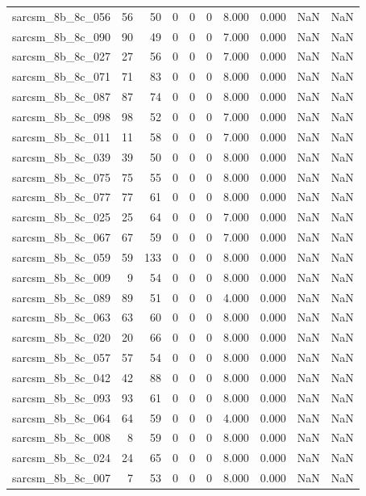 \documentclass{article}
\begin{document}
\begin{longtable}{lrrrrrrrrr}
sarcsm\_8b\_8c\_056 & 56 & 50 & 0 & 0 & 0 & 8.000 & 0.000 & NaN & NaN \\
sarcsm\_8b\_8c\_090 & 90 & 49 & 0 & 0 & 0 & 7.000 & 0.000 & NaN & NaN \\
sarcsm\_8b\_8c\_027 & 27 & 56 & 0 & 0 & 0 & 7.000 & 0.000 & NaN & NaN \\
sarcsm\_8b\_8c\_071 & 71 & 83 & 0 & 0 & 0 & 8.000 & 0.000 & NaN & NaN \\
sarcsm\_8b\_8c\_087 & 87 & 74 & 0 & 0 & 0 & 8.000 & 0.000 & NaN & NaN \\
sarcsm\_8b\_8c\_098 & 98 & 52 & 0 & 0 & 0 & 7.000 & 0.000 & NaN & NaN \\
sarcsm\_8b\_8c\_011 & 11 & 58 & 0 & 0 & 0 & 7.000 & 0.000 & NaN & NaN \\
sarcsm\_8b\_8c\_039 & 39 & 50 & 0 & 0 & 0 & 8.000 & 0.000 & NaN & NaN \\
sarcsm\_8b\_8c\_075 & 75 & 55 & 0 & 0 & 0 & 8.000 & 0.000 & NaN & NaN \\
sarcsm\_8b\_8c\_077 & 77 & 61 & 0 & 0 & 0 & 8.000 & 0.000 & NaN & NaN \\
sarcsm\_8b\_8c\_025 & 25 & 64 & 0 & 0 & 0 & 7.000 & 0.000 & NaN & NaN \\
sarcsm\_8b\_8c\_067 & 67 & 59 & 0 & 0 & 0 & 7.000 & 0.000 & NaN & NaN \\
sarcsm\_8b\_8c\_059 & 59 & 133 & 0 & 0 & 0 & 8.000 & 0.000 & NaN & NaN \\
sarcsm\_8b\_8c\_009 & 9 & 54 & 0 & 0 & 0 & 8.000 & 0.000 & NaN & NaN \\
sarcsm\_8b\_8c\_089 & 89 & 51 & 0 & 0 & 0 & 4.000 & 0.000 & NaN & NaN \\
sarcsm\_8b\_8c\_063 & 63 & 60 & 0 & 0 & 0 & 8.000 & 0.000 & NaN & NaN \\
sarcsm\_8b\_8c\_020 & 20 & 66 & 0 & 0 & 0 & 8.000 & 0.000 & NaN & NaN \\
sarcsm\_8b\_8c\_057 & 57 & 54 & 0 & 0 & 0 & 8.000 & 0.000 & NaN & NaN \\
sarcsm\_8b\_8c\_042 & 42 & 88 & 0 & 0 & 0 & 8.000 & 0.000 & NaN & NaN \\
sarcsm\_8b\_8c\_093 & 93 & 61 & 0 & 0 & 0 & 8.000 & 0.000 & NaN & NaN \\
sarcsm\_8b\_8c\_064 & 64 & 59 & 0 & 0 & 0 & 4.000 & 0.000 & NaN & NaN \\
sarcsm\_8b\_8c\_008 & 8 & 59 & 0 & 0 & 0 & 8.000 & 0.000 & NaN & NaN \\
sarcsm\_8b\_8c\_024 & 24 & 65 & 0 & 0 & 0 & 8.000 & 0.000 & NaN & NaN \\
sarcsm\_8b\_8c\_007 & 7 & 53 & 0 & 0 & 0 & 8.000 & 0.000 & NaN & NaN \\

\end{longtable}
\end{document}
